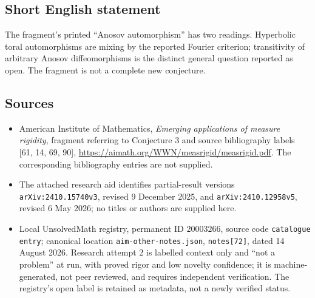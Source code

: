 \documentclass[11pt]{article}
\begin{document}
\subsection{Short English statement}
The fragment's printed ``Anosov automorphism'' has two readings. Hyperbolic toral automorphisms are mixing by the reported Fourier criterion; transitivity of arbitrary Anosov diffeomorphisms is the distinct general question reported as open. The fragment is not a complete new conjecture.
\subsection{Sources}
\begin{itemize}
\item American Institute of Mathematics, \emph{Emerging applications of measure rigidity}, fragment referring to Conjecture 3 and source bibliography labels [61, 14, 69, 90], \url{https://aimath.org/WWN/measrigid/measrigid.pdf}. The corresponding bibliography entries are not supplied.
\item The attached research aid identifies partial-result versions \texttt{arXiv:2410.15740v3}, revised 9 December 2025, and \texttt{arXiv:2410.12958v5}, revised 6 May 2026; no titles or authors are supplied here.
\item Local UnsolvedMath registry, permanent ID $20003266$, source code \texttt{catalogue entry}; canonical location \texttt{aim-other-notes.json}, \texttt{notes[72]}, dated 14 August 2026. Research attempt 2 is labelled context only and ``not a problem'' at run, with proved rigor and low novelty confidence; it is machine-generated, not peer reviewed, and requires independent verification. The registry's open label is retained as metadata, not a newly verified status.
\end{itemize}
\end{document}
